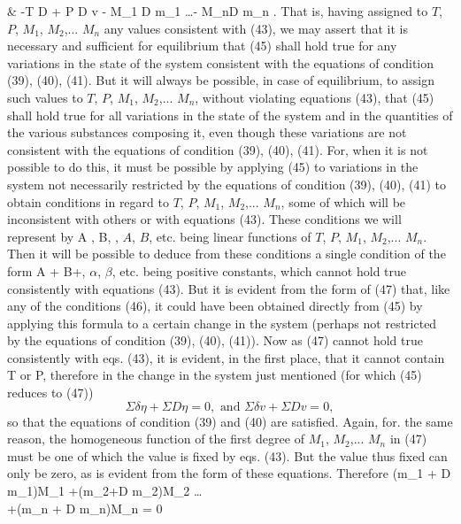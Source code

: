 \documentclass[12pt]{memoir}
\begin{document}
& -T \Sigma D \eta + P \Sigma D v - M_1 \Sigma D m_1 \dots - M_n\Sigma D m_n .  \label{45}\eqe
That is, having assigned to $T$, $P$, $M_1$, $M_2$,... $M_n$ any values consistent with (43), we may assert that it is necessary and sufficient for equilibrium that (45) shall hold true for any variations in the state of the system consistent with the equations of condition (39), (40),
(41). But it will always be possible, in case of equilibrium, to assign such values to $T$, $P$, $M_1$, $M_2$,... $M_n$, without violating equations (43), that (45) shall hold true for all variations in the state of the system and in the quantities of the various substances composing it, even though these variations are not consistent with the equations of condition (39), (40), (41). For, when it is not possible to do this, it must be possible by applying (45) to variations in the system not necessarily restricted by the equations of condition (39), (40), (41) to obtain conditions in regard to $T$, $P$, $M_1$, $M_2$,... $M_n$, some of which will be inconsistent with others or with equations (43). These conditions we will represent by
\eqs A ,\text{ } B, ,                  \label{46}\eqe
$A$, $B$, etc. being linear functions of $T$, $P$, $M_1$, $M_2$,... $M_n$. Then it will be possible to deduce from these conditions a single condition of the form
\eqs \alpha A + \beta B+,                 \label{47}\eqe
$\alpha$, $\beta$, etc. being positive constants, which cannot hold true consistently with equations (43). But it is evident from the form of (47) that, like any of the conditions (46), it could have been obtained directly from (45) by applying this formula to a certain change in the system (perhaps not restricted by the equations of condition (39), (40), (41)). Now as (47) cannot hold true consistently with eqs. (43), it is evident, in the first place, that it cannot contain T or P, therefore in the change in the system just mentioned (for which (45) reduces to (47))
$$\Sigma \delta \eta + \Sigma D \eta = 0, \text{     and     } \Sigma \delta v + \Sigma D v = 0,$$
so that the equations of condition (39) and (40) are satisfied. Again, for. the same reason, the homogeneous function of the first degree of $M_1$, $M_2$,... $M_n$ in (47) must be one of which the value is fixed by eqs. (43). But the value thus fixed can only be zero, as is evident from the form of these equations. Therefore
\eqs
(\Sigma \delta m_1 + \Sigma D m_1)M_1 +(\Sigma \delta m_2+\Sigma D m_2)M_2 \dots\\
+(\Sigma \delta m_n + \Sigma D m_n)M_n = 0  \label{48}
\end{document}
